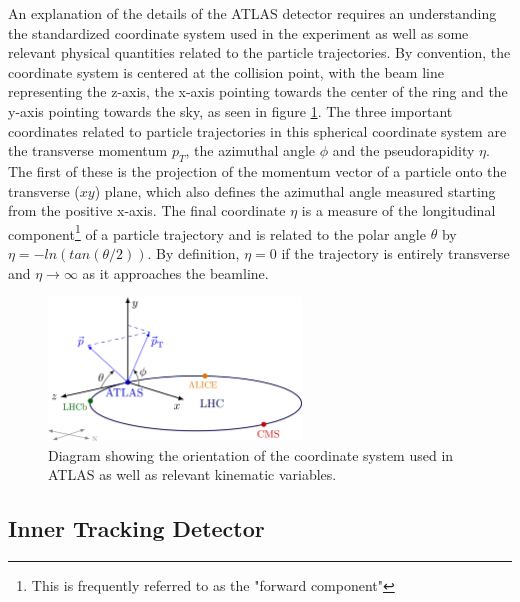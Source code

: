 An explanation of the details of the ATLAS detector requires an understanding the standardized coordinate system used in the 
experiment as well as some relevant physical quantities related to the particle trajectories. By convention, the coordinate 
system is centered at the collision point, with the beam line representing the z-axis, the x-axis pointing towards the center 
of the ring and the y-axis pointing towards the sky, as seen in figure \ref{fig:ATLAS_Coordinate_System}. The three important 
coordinates related to particle trajectories in this spherical coordinate system are the transverse momentum $p_T$, the 
azimuthal angle $\phi$ and the pseudorapidity $\eta$. The first of these is the projection of the momentum vector of a 
particle onto the transverse ($xy$) plane, which also defines the azimuthal angle measured starting from the positive x-axis. 
The final coordinate $\eta$ is a measure of the longitudinal component\footnote{This is frequently referred to as the "forward 
component"} of a particle trajectory and is related to the polar angle $\theta$ by $\eta = -ln(tan(\theta/2))$. By definition, 
$\eta = 0$ if the trajectory is entirely transverse and $\eta \rightarrow \infty$ as it approaches the beamline.

\begin{figure}
\centering
    \includegraphics[width=0.6\textwidth]{images/ATLAS_Coordinate_System.png}
    \caption{Diagram showing the orientation of the coordinate system used in ATLAS as well as relevant kinematic 
    variables.}
    \label{fig:ATLAS_Coordinate_System}
\end{figure}

\subsection{Inner Tracking Detector}

